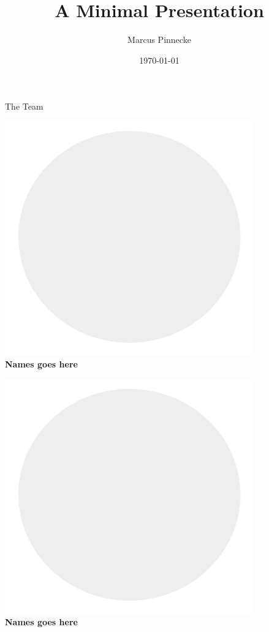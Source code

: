 \documentclass{beamer}
\title{A Minimal Presentation}
\date{\today}
\author{Marcus Pinnecke}
\institute{Metrocity Theme Headquarter}
\begin{document}
  \begin{frame}[t]{The Team}
	\begin{minipage}{0.3\linewidth}
		\begin{center}
			\includegraphics[width=0.8\textwidth]{show-team/avatar-placeholder.png}\\
		\textbf{Names goes here}
		\end{center}
	\end{minipage}
	\hfill
	\begin{minipage}{0.3\linewidth}
		\begin{center}
			\includegraphics[width=0.8\textwidth]{show-team/avatar-placeholder.png}\\
		\textbf{Names goes here}

\end{center}
\end{minipage}
\end{frame}
\end{document}
